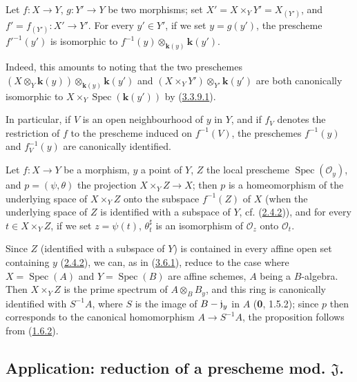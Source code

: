 \begin{proposition}
\label{I.3.6.4}
Let $f:X\to Y$, $g:Y'\to Y$ be two morphisms; set
$X'=X\times_Y Y'=X_{(Y')}$, and
$f'=f_{(Y')}:X'\to Y'$. For every $y'\in Y'$, if we set $y=g(y')$, the
prescheme $f'^{-1}(y')$ is isomorphic to
$f^{-1}(y)\otimes_{\boldsymbol{k}(y)}\boldsymbol{k}(y')$.
\end{proposition}

Indeed, this amounts to noting that the two preschemes
$(X\otimes_Y \boldsymbol{k}(y))\otimes_{\boldsymbol{k}(y)}\boldsymbol{k}(y')$ and
$(X\times_Y Y')\otimes_{Y'}\boldsymbol{k}(y')$ are both canonically isomorphic to
$X\times_Y\operatorname{Spec}(\boldsymbol{k}(y'))$ by
(\hyperref[I.3.3.9.1]{3.3.9.1}).

In particular, if $V$ is an open neighbourhood of $y$ in $Y$, and if
$f_V$ denotes the restriction of $f$ to the prescheme induced on $f^{-1}(V)$,
the preschemes $f^{-1}(y)$ and $f_V^{-1}(y)$ are canonically identified.

\begin{proposition}[3.6.5]
\label{I.3.6.5}
Let $f:X\to Y$ be a morphism, $y$ a point of $Y$, $Z$ the local prescheme
$\operatorname{Spec}(\mathcal{O}_y)$, and $p=(\psi,\theta)$ the projection
$X\times_Y Z\to X$; then $p$ is a homeomorphism of the underlying space of
$X\times_Y Z$ onto the subspace $f^{-1}(Z)$ of $X$ \textup{(when the underlying space
of $Z$ is identified with a subspace of $Y$, cf.
\textup{(\hyperref[I.2.4.2]{2.4.2})})}, and for every $t\in X\times_Y Z$, if we set
$z=\psi(t)$, $\theta_t^\sharp$ is an isomorphism of $\mathcal{O}_z$ onto
$\mathcal{O}_t$.
\end{proposition}

Since $Z$ (identified with a subspace of $Y$) is contained in every affine
open set containing $y$ (\hyperref[I.2.4.2]{2.4.2}), we can, as in
(\hyperref[I.3.6.1]{3.6.1}), reduce to the case where
$X=\operatorname{Spec}(A)$ and $Y=\operatorname{Spec}(B)$ are affine schemes,
$A$ being a $B$-algebra. Then $X\times_Y Z$ is the prime spectrum
of $A\otimes_B B_y$, and this ring is canonically identified with $S^{-1}A$,
where $S$ is the image of $B-\mathfrak{j}_y$ in $A$ (\textbf{0}, 1.5.2); since $p$
then corresponds to the canonical homomorphism $A\to S^{-1}A$, the proposition
follows from (\hyperref[I.1.6.2]{1.6.2}).

\subsection{Application: reduction of a prescheme mod.
\texorpdfstring{$\mathfrak{J}$\protect\footnotemark}{J}.}
\label{subsection:I.3.7}
\label{I.3.7}

